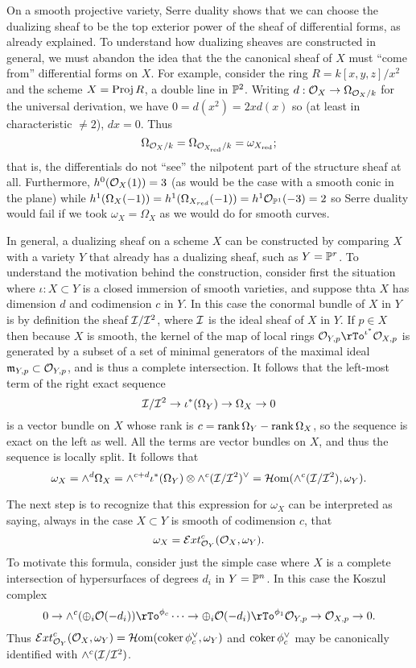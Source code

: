 On a smooth projective variety, Serre duality shows that we can choose the dualizing sheaf to be the top exterior power of the sheaf of differential forms, as already explained. To understand how dualizing sheaves are constructed in general, we must abandon the idea that the the canonical sheaf of $X$ must ``come from'' differential forms on $X$. For example, consider the ring $R = k[x,y,z]/x^{2}$ and the scheme $X = \Proj R$, a double line in $\PP^{2}$. Writing $d: \sO_{X}\to \Omega_{\sO_{X}/k}$ for the universal derivation, we have $0 = d(x^{2}) = 2xd(x)$ so (at least in characteristic $\neq 2$), $dx = 0$. Thus 
\def\red{{\rm red}}
$$
\Omega_{\sO_{X}/k} = \Omega_{\sO_{X_{\red}}/k} = \omega_{X_{\red}};
$$ 
that is, the differentials do not ``see'' the nilpotent part of the structure sheaf at all. Furthermore, 
$
h^{0}(\sO_{X}(1)) = 3
$
(as would be the case with a smooth conic in the plane)
while 
$
h^{1}(\Omega_{X} (-1)) = h^{1}(\Omega_{X_{red}} (-1)) = h^{1}\sO_{\PP^{1}}(-3) = 2
$
so Serre duality would fail if we took $\omega_{X} = \Omega_{X}$ as we would do for smooth curves.

In general, a dualizing sheaf on a scheme $X$ can be constructed by comparing $X$ with a 
variety $Y$ that already has a dualizing sheaf, such as $Y=\PP^{r}$. To understand the motivation behind the construction, 
consider first the situation where $\iota: X\subset Y$ is a closed immersion of smooth varieties, and suppose thta $X$ has dimension $d$ and codimension $c$ in $Y$.
In this case the conormal bundle of $X$ in $Y$ is by definition the sheaf
$\cI/\cI^{2}$, where $\cI$ is the ideal sheaf of $X$ in $Y$. If $p\in X$ then because $X$ is smooth, the kernel of the map of local rings $\cO_{Y,p} \rTo^{\iota^{*}} \cO_{X,p}$ is generated by a subset of a set of minimal generators of the maximal ideal $\gm_{Y,p}\subset \cO_{Y,p}$, and is thus a complete intersection. It follows that the left-most term of the right exact sequence
$$
\cI/\cI^{2} \to \iota^{*}(\Omega_{Y}) \to\Omega_{X} \to 0
$$
is a vector bundle on $X$ whose rank is  $c = \rank \Omega_{Y} -\rank \Omega_{X}$, so the sequence is exact on the left as well. All the terms are vector bundles on $X$, and thus the sequence
is locally split. It follows that 
$$
\omega_X = \wedge^{d}\Omega_{X} = \wedge^{c+d} \iota^{*}(\Omega_{Y})\otimes \wedge^{c}(\cI/\cI^{2})^{\vee} = \sHom(\wedge^{c}(\cI/\cI^{2}), \omega_{Y}).
$$ 

The next step is to recognize that this expression for $\omega_X$ can be interpreted as saying, always in the case $X\subset Y$ is smooth of
codimension $c$, that
$$
\omega_{X} = \sExt^{c}_{\cO_{Y}}(\cO_{X}, \omega_{Y}).
$$
To motivate this formula, consider just the simple case where $X$ is a complete intersection of hypersurfaces
of degrees $d_{i}$ in $Y = \PP^{n}$. In this case the Koszul complex
$$
0\to \wedge^{c} (\oplus_{i}\cO(-d_{i})) \rTo^{\phi_{c}} \cdots \to \oplus_{i}\cO(-d_{i}) \rTo^{\phi_{1}}\cO_{Y,p} \to\cO_{X,p} \to 0.
$$
Thus $\sExt^{c}_{\cO_{Y}}(\cO_{X}, \omega_{Y}) = \sHom(\coker \phi_{c}^{\vee}, \omega_{Y})$
and $\coker \phi_{c}^{\vee}$ may be canonically identified with $\wedge^{c}(\cI/\cI^{2})$.

